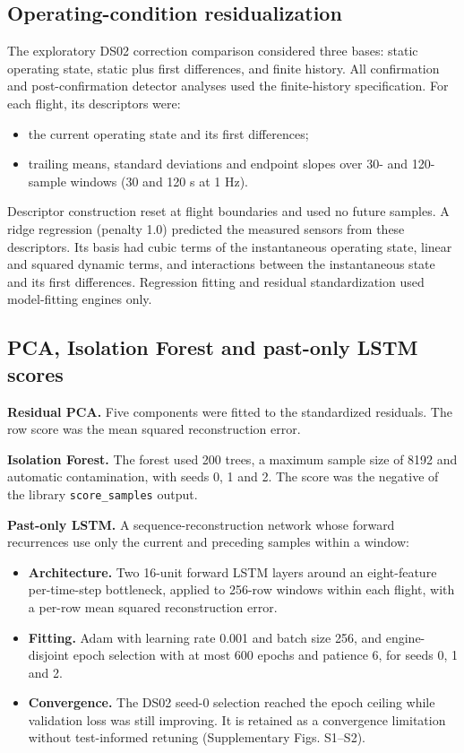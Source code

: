 \documentclass[preprint,11pt,a4paper]{elsarticle}
\begin{document}
\subsection{Operating-condition residualization}

The exploratory DS02 correction comparison considered three bases: static operating state, static plus first differences, and finite history. All confirmation and post-confirmation detector analyses used the finite-history specification. For each flight, its descriptors were:
\begin{itemize}
\item the current operating state and its first differences;
\item trailing means, standard deviations and endpoint slopes over 30- and 120-sample windows (30 and 120 s at 1 Hz).
\end{itemize}

Descriptor construction reset at flight boundaries and used no future samples. A ridge regression (penalty 1.0) predicted the measured sensors from these descriptors. Its basis had cubic terms of the instantaneous operating state, linear and squared dynamic terms, and interactions between the instantaneous state and its first differences. Regression fitting and residual standardization used model-fitting engines only.

\subsection{PCA, Isolation Forest and past-only LSTM scores}

\textbf{Residual PCA.} Five components were fitted to the standardized residuals. The row score was the mean squared reconstruction error.

\textbf{Isolation Forest.} The forest used 200 trees, a maximum sample size of 8192 and automatic contamination, with seeds 0, 1 and 2. The score was the negative of the library \texttt{score\_samples} output.

\textbf{Past-only LSTM.} A sequence-reconstruction network whose forward recurrences use only the current and preceding samples within a window:
\begin{itemize}
\item \textbf{Architecture.} Two 16-unit forward LSTM layers around an eight-feature per-time-step bottleneck, applied to 256-row windows within each flight, with a per-row mean squared reconstruction error.
\item \textbf{Fitting.} Adam with learning rate 0.001 and batch size 256, and engine-disjoint epoch selection with at most 600 epochs and patience 6, for seeds 0, 1 and 2.
\item \textbf{Convergence.} The DS02 seed-0 selection reached the epoch ceiling while validation loss was still improving. It is retained as a convergence limitation without test-informed retuning (Supplementary Figs. S1–S2).
\end{itemize}
\end{document}
